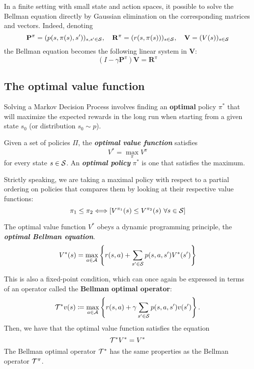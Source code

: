 \documentclass[../course-notes.tex]{subfiles}
\begin{document}
In a finite setting with small state and action spaces, it possible to solve the Bellman equation directly by Gaussian elimination on the corresponding matrices and vectors.
Indeed, denoting
\[
	\mathbf{P}^\pi =(p(s,\pi(s),s'))_{s,s'\in\mathcal{S}},\quad
	\mathbf{R}^\pi = (r(s,\pi(s)))_{s\in\mathcal{S}},
	\quad
	\mathbf{V} = (V(s))_{s\in\mathcal{S}}
\]
the Bellman equation becomes the following linear system in $\mathbf{V}$:
\begin{equation}\label{eq:BellmanEqnMatrixVector}
	(I - \gamma\mathbf{P}^\pi)\mathbf{V} =
	\mathbf{R}^\pi
\end{equation}


\subsection{The optimal value function}\label{sec:OptimalValueFunc}

Solving a Markov Decision Process involves finding an \textbf{\bluefont optimal} policy $\pi^*$ that will maximize the expected rewards in the long run when starting from a given state $s_0$ (or distribution $s_0 \sim p$).

\begin{defn}
	Given a set of policies $\Pi$, the \emph{\bfseries\bluefont optimal value function} satisfies
	\begin{equation}
	V^* = \max_{\pi} V^{\pi}
	\end{equation}
	for every state $s \in \mathcal{S}$. An \emph{\bfseries\bluefont optimal policy} $\pi^*$ is one that satisfies the maximum.
\end{defn}

Strictly speaking, we are taking a maximal policy with respect to a partial ordering on policies that compares them by looking at their respective value functions:
\[
	\pi_1 \leq \pi_2 \Longleftrightarrow
	\left[
	V^{\pi_1}(s) \leq V^{\pi_2}(s)\ \forall s\in\mathcal{S}
	\right]
\]


\begin{prop}
	The optimal value function $V^*$ obeys a dynamic programming principle, the \emph{\bfseries\bluefont optimal Bellman equation}.
	\begin{equation}\label{eq:ValueOptimalBellmanEq}
	V^*(s) = \max_{a\in\mathcal{A}}
	\left\{
	r(s,a) + \sum_{s'\in\mathcal{S}} p(s,a,s')V^*(s')
	\right\}
	\end{equation}
\end{prop}


This is also a fixed-point condition, which can once again be expressed in terms of an operator called the \textbf{Bellman optimal operator}:
\[
\mathcal{T}^*v(s) \coloneqq
\max_{a\in\mathcal{A}} \left\{
r(s,a) + \gamma\sum_{s'\in\mathcal{S}}p(s,a,s')v(s')
\right\}.
\]
Then, we have that the optimal value function satisfies the equation
\[
\mathcal{T}^* V^* = V^*
\]
The Bellman optimal operator $\mathcal{T}^*$ has the same properties as the Bellman operator $\mathcal{T}^\pi$.
\end{document}

